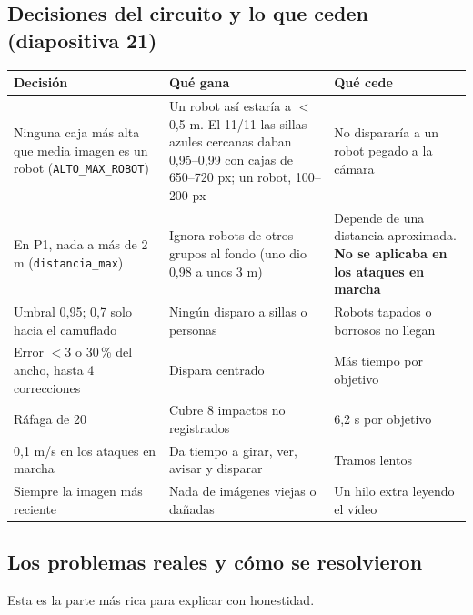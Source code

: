 \documentclass[11pt,a4paper]{article}
\newcommand{\cod}[1]{\texttt{#1}}
\newcommand{\gr}{\textdegree{}}
\begin{document}
\subsection{Decisiones del circuito y lo que ceden (diapositiva 21)}
\begin{longtable}{@{}P{3.6cm}P{5.5cm}P{5.4cm}@{}}
\toprule
\textbf{Decisión} & \textbf{Qué gana} & \textbf{Qué cede} \\
\midrule
\endhead
Ninguna caja más alta que media imagen es un robot (\cod{ALTO\_\allowbreak{}MAX\_\allowbreak{}ROBOT}) & Un robot así estaría a $<$0,5 m. El 11/11 las sillas azules cercanas daban 0,95--0,99 con cajas de 650--720 px; un robot, 100--200 px & No dispararía a un robot pegado a la cámara \\
En P1, nada a más de 2 m (\cod{distancia\_\allowbreak{}max}) & Ignora robots de otros grupos al fondo (uno dio 0,98 a unos 3 m) & Depende de una distancia aproximada. \textbf{No se aplicaba en los ataques en marcha} \\
Umbral 0,95; 0,7 solo hacia el camuflado & Ningún disparo a sillas o personas & Robots tapados o borrosos no llegan \\
Error $<$3\gr{} o 30\,\% del ancho, hasta 4 correcciones & Dispara centrado & Más tiempo por objetivo \\
Ráfaga de 20 & Cubre 8 impactos no registrados & 6,2 s por objetivo \\
0,1 m/s en los ataques en marcha & Da tiempo a girar, ver, avisar y disparar & Tramos lentos \\
Siempre la imagen más reciente & Nada de imágenes viejas o dañadas & Un hilo extra leyendo el vídeo \\
\bottomrule
\end{longtable}

\subsection{Los problemas reales y cómo se resolvieron}
Esta es la parte más rica para explicar con honestidad.
\end{document}

